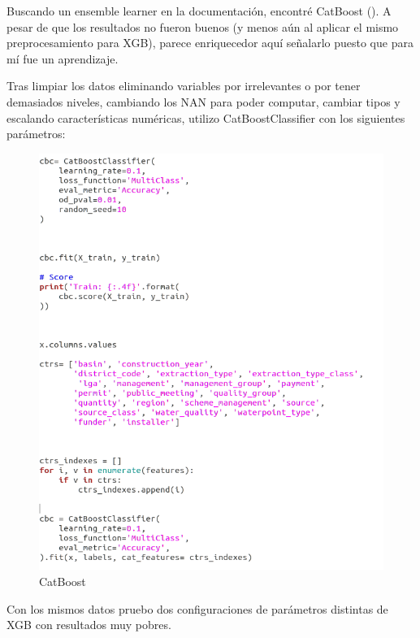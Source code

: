 Buscando un ensemble learner en la documentación, encontré CatBoost (\cite{catboost1}). A pesar de que los resultados no fueron buenos (y menos aún al aplicar el mismo preprocesamiento para XGB), parece enriquecedor aquí señalarlo puesto que para mí fue un aprendizaje.  

Tras limpiar los datos eliminando variables por irrelevantes o por tener demasiados niveles, cambiando los NAN para poder computar, cambiar tipos y escalando características numéricas, utilizo CatBoostClassifier con los siguientes parámetros: 

\begin{figure}[H] %
	\centering
	\includegraphics[scale=0.35]{catboost1.png}  %
	\caption{CatBoost} 
	\label{fig:CB1}
\end{figure}


Con los mismos datos pruebo dos configuraciones de parámetros distintas de XGB con resultados muy pobres.

